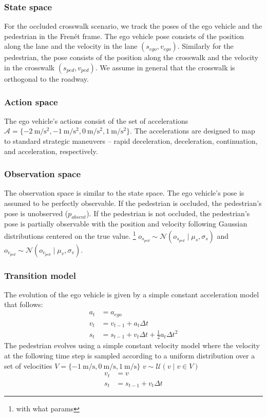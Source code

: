 \documentclass[conference]{IEEEtran}
\begin{document}
\subsubsection{State space} For the occluded crosswalk scenario, we track the poses of the ego vehicle and the pedestrian in the Fren\'et frame. The ego vehicle pose consists of the position along the lane and the velocity in the lane $(s_{ego}, v_{ego})$. Similarly for the pedestrian, the pose consists of the position along the crosswalk and the velocity in the crosswalk $(s_{ped}, v_{ped})$. We assume in general that the crosswalk is orthogonal to the roadway.

\subsubsection{Action space} The ego vehicle's actions consist of the set of accelerations $\mathcal{A} = \{-2~\si{\meter\per\square\second}, -1~\si{\meter\per\square\second}, 0~\si{\meter\per\square\second}, 1~\si{\meter\per\square\second}\}$. The accelerations are designed to map to standard strategic maneuvers -- rapid deceleration, deceleration, continuation, and acceleration, respectively.

\subsubsection{Observation space} The observation space is similar to the state space. The ego vehicle's pose is assumed to be perfectly observable. If the pedestrian is occluded, the pedestrian's pose is unobserved ($p_{absent}$). If the pedestrian is not occluded, the pedestrian's pose is partially observable with the position and velocity following Gaussian distributions centered on the true value. \footnote{with what params} $o_{s_{ped}} \sim \mathcal{N}(o_{s_{ped}} \mid \mu_s, \sigma_s)$ and $o_{v_{ped}} \sim \mathcal{N}(o_{v_{ped}} \mid \mu_v, \sigma_v)$.

\subsubsection{Transition model} The evolution of the ego vehicle is given by a simple constant acceleration model that follows:
\begin{align}
    a_t &= a_{ego} \nonumber \\
    v_t &= v_{t-1} + a_t \Delta t \\
    s_t &= s_{t-1} + v_t \Delta t + \tfrac{1}{2} a_t \Delta t^2 \nonumber
\end{align}
The pedestrian evolves using a simple constant velocity model where the velocity at the following time step is sampled according to a uniform distribution over a set of velocities $V = \{-1~\si{\meter\per\second}, 0~\si{\meter\per\second}, 1~\si{\meter\per\second}\}$ $v \sim \mathcal{U}(v \mid v \in V)$
\begin{align}
    v_t &= v \nonumber \\
    s_t &= s_{t-1} + v_t \Delta t 
\end{align}
\end{document}
